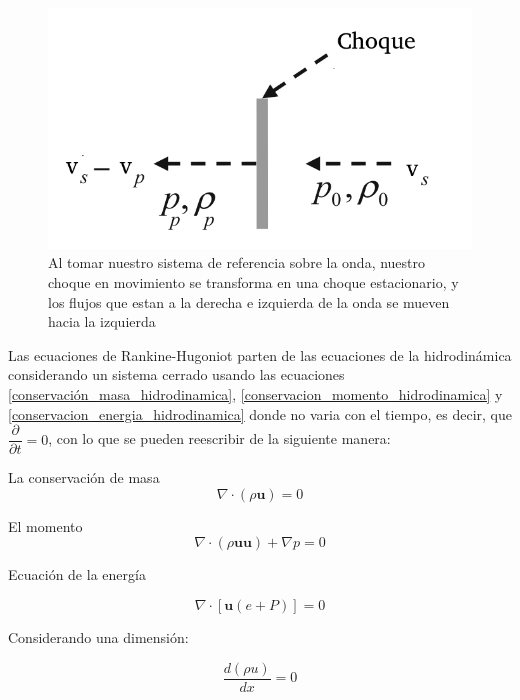\documentclass[12pt,a4paper]{book}
\begin{document}
\begin{figure} 
  \centering
  \includegraphics[scale=0.7]{./Figuras/Teoria/stationary_shock.png}
  \caption{Al tomar nuestro sistema de referencia sobre la onda, nuestro choque en movimiento se transforma en una choque estacionario, y los
  flujos que estan a la derecha e izquierda de la onda se mueven hacia la izquierda } \label{fig_stationary_shock}
\end{figure}

Las ecuaciones de Rankine-Hugoniot parten de las ecuaciones de la hidrodinámica considerando un sistema cerrado usando las ecuaciones \ref{conservación_masa_hidrodinamica}, \ref{conservacion_momento_hidrodinamica} y \ref{conservacion_energia_hidrodinamica} donde no varia con el tiempo, es decir, que $\dfrac{\partial}{\partial t}=0$, con lo que se pueden reescribir de la siguiente manera:


La conservación de masa
\begin{equation}
  \nabla \cdot \left( \rho \mathbf{u} \right)=0
\end{equation}

El momento
\begin{equation}
  \nabla \cdot \left( \rho \mathbf{u u} \right) + \nabla p = 0
\end{equation}

Ecuación de la energía

\begin{equation}
 \nabla \cdot \left[ \mathbf{u} \left( e+P \right) \right] = 0
\end{equation}

Considerando una dimensión:

\begin{equation}
\dfrac{d \left( \rho u \right)}{d x} = 0
\end{equation}
\end{document}
